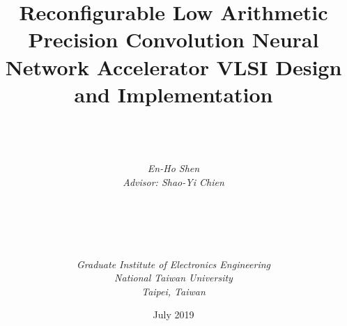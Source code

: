 \documentclass[a4paper, 12pt, twoside, openright]{mythesis}
\begin{document}
\title{\textbf{Reconfigurable Low Arithmetic Precision Convolution Neural Network Accelerator VLSI Design and Implementation}}


\author{ \\  \\ \\
{\it En-Ho Shen}\\
{\it Advisor: Shao-Yi Chien} \\ \\ \\ \\  \\ \\
{\it Graduate Institute of Electronics Engineering}\\
{\it National Taiwan University} \\
{\it Taipei, Taiwan}\\ }

{\date{July 2019}}

\maketitle

\frontmatter

\tableofcontents
\listoffigures
\listoftables


\mainmatter







%




\end{document}
